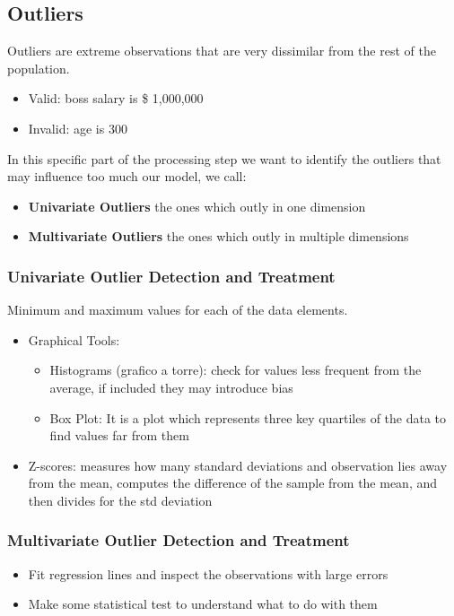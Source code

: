     \subsection{Outliers}
        Outliers are extreme observations that are very dissimilar from the rest of the population.
        \begin{itemize}
            \item Valid: boss salary is \$ 1,000,000
            \item Invalid: age is 300 
        \end{itemize}
        In this specific part of the processing step we want to identify the outliers that may influence too much our model, we call:
        \begin{itemize}
            \item \textbf{Univariate Outliers} the ones which outly in one dimension
            \item \textbf{Multivariate Outliers} the ones which outly in multiple dimensions
        \end{itemize}
        \subsubsection{Univariate Outlier Detection and Treatment}
            Minimum and maximum values for each of the data elements.
            \begin{itemize}
                \item Graphical Tools:
                \begin{itemize}
                    \item Histograms (grafico a torre): check for values less frequent from the average, if included they may introduce bias
                    \item Box Plot: It is a plot which represents three key quartiles of the data to find values far from them 
                \end{itemize}
                \item Z-scores: measures how many standard deviations and observation lies away from the mean, computes the difference of the sample from the mean, and then divides for the std deviation
            \end{itemize}
        \subsubsection{Multivariate Outlier Detection and Treatment}
            \begin{itemize}
                \item Fit regression lines and inspect the observations with large errors 
                \item Make some statistical test to understand what to do with them
            \end{itemize}
